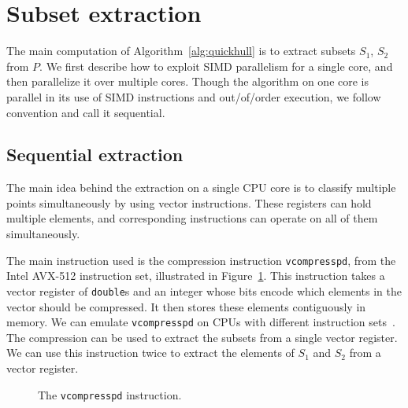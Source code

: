 \documentclass[11pt,a4paper]{article}
\begin{document}
\section{Subset extraction}\label{sec:subset}
The main computation of Algorithm~\ref{alg:quickhull} is to extract subsets $S_1$, $S_2$ from $P$.
We first describe how to exploit SIMD parallelism for a single core, and then parallelize it over multiple cores.
Though the algorithm on one core is parallel in its use of SIMD instructions and out\-/of\-/order execution, we follow convention and call it sequential.

\subsection{Sequential extraction}
The main idea behind the extraction on a single CPU core is to classify multiple points simultaneously by using vector instructions.
These registers can hold multiple elements, and corresponding instructions can operate on all of them simultaneously.

The main instruction used is the compression instruction \texttt{vcompresspd}, from the Intel AVX-512 instruction set, illustrated in Figure~\ref{fig:compress}.
This instruction takes a vector register of \texttt{double}s and an integer whose bits encode which elements in the vector should be compressed.
It then stores these elements contiguously in memory.
We can emulate \texttt{vcompresspd} on CPUs with different instruction sets~\cite{wassenberg2022vectorized}.
The compression can be used to extract the subsets from a single vector register.
We can use this instruction twice to extract the elements of $S_1$ and $S_2$ from a vector register.

\begin{figure}[ht]
  \centering
  \caption{The \texttt{vcompresspd} instruction.}%
  \label{fig:compress}%
\end{figure}
\end{document}
